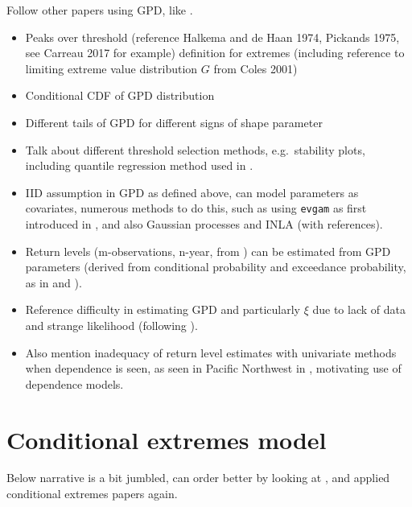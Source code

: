 \documentclass{article}
\numberwithin{equation}{section}
\begin{document}
Follow other papers using GPD, like \cite{Carreau2017}. 
\begin{itemize}
  \item Peaks over threshold (reference Halkema and de Haan 1974, Pickands 1975, see Carreau 2017 for example) definition for extremes (including reference to limiting extreme value distribution $G$ from Coles 2001)
  \item Conditional CDF of GPD distribution
  \item Different tails of GPD for different signs of shape parameter
  \item Talk about different threshold selection methods, e.g.\ stability plots, including quantile regression method used in \cite{Youngman2019}.
  \item IID assumption in GPD as defined above, can model parameters as covariates, numerous methods to do this, such as using \texttt{evgam} as first introduced in \cite{Youngman2019}, and also Gaussian processes and INLA (with references).
  \item Return levels (m-observations, n-year, from \cite{Coles2001}) can be estimated from GPD parameters (derived from conditional probability and exceedance probability, as in \cite{Cooley2007} and \cite{Coles2001}). 
  \item Reference difficulty in estimating GPD and particularly $\xi$ due to lack of data and strange likelihood (following \cite{Coles2001}). 
  \item Also mention inadequacy of return level estimates with univariate methods when dependence is seen, as seen in Pacific Northwest in \cite{Winter2016}, motivating use of dependence models. 
\end{itemize}

\section{Conditional extremes model}\label{sec:ce}

Below narrative is a bit jumbled, can order better by looking at \cite{Heffernan2004}, \cite{Keef2013} and applied conditional extremes papers again. 
\end{document}
